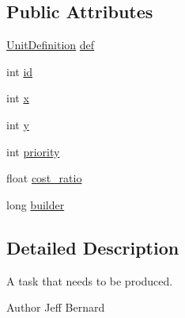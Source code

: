 \subsection*{Public Attributes}
\begin{DoxyCompactItemize}
\item 
\hyperlink{classrts_1_1units_1_1_unit_definition}{UnitDefinition} \hyperlink{classai_1_1general_1_1_general_a_i_production_a1dba4dcb9529b0ec1fbdd5877fc9e80e}{def}
\item 
int \hyperlink{classai_1_1general_1_1_general_a_i_production_af587890ea032afe2018b3703eba0d644}{id}
\item 
int \hyperlink{classai_1_1general_1_1_general_a_i_production_a3c94de84a840dc628a6417ecd25936b2}{x}
\item 
int \hyperlink{classai_1_1general_1_1_general_a_i_production_ae4762a57aa2905a200ffad36cfbdad4e}{y}
\item 
int \hyperlink{classai_1_1general_1_1_general_a_i_production_ab2757baddd4d87440339c2df5245bdb9}{priority}
\item 
float \hyperlink{classai_1_1general_1_1_general_a_i_production_acfb00da6fdc3b54f03286bb570639457}{cost\_\-ratio}
\item 
long \hyperlink{classai_1_1general_1_1_general_a_i_production_ad61bcf26860fa5d16c9bd0d7584d7a76}{builder}
\end{DoxyCompactItemize}


\subsection{Detailed Description}
A task that needs to be produced. 

\begin{DoxyAuthor}{Author}
Jeff Bernard 
\end{DoxyAuthor}


